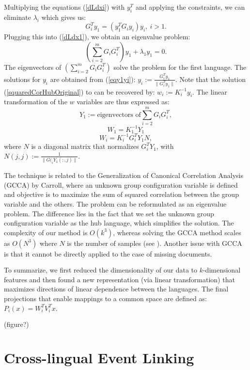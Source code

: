 \documentclass[twoside,11pt]{article}
\begin{document}
Multiplying the equations (\ref{dLdxi}) with $y_i^T$ and applying the constraints, we can eliminate $\lambda_i$ which gives us:
\begin{equation}\label{eqy1yi}
G_{i}^T y_1 = \left(y_1^T G_{i} y_i \right) y_i,~i > 1.
\end{equation}
Plugging this into (\ref{dLdx1}), we obtain an eigenvalue problem:
$$\left( \sum_{i = 2}^m G_i G_{i}^T \right) y_1 + \lambda_1 y_1 = 0.$$
The eigenvectors of $\left( \sum_{i = 2}^m G_i G_{i}^T \right)$ solve the problem for the first language. The solutions for $y_i$ are obtained from (\ref{eqy1yi}): $y_i := \frac{G_{i}^T y_1}{\| G_{i}^T y_1 \|}$.
Note that the solution (\ref{squaredCorHubOriginal}) to can be recovered by: $w_i := K_i^{-1} y_i$. The linear transformation of the $w$ variables are thus expressed as:
$$ Y_1 := \text{eigenvectors of} \sum_{i = 2}^m G_i G_{i}^T, $$
$$ W_1 = K_1^{-1} Y_1 $$
$$ W_i = K_i^{-1} G_{i}^T Y_1 N,$$
where $N$ is a diagonal matrix that normalizes $G_{i}^T Y_1$, with $N(j,j) := \frac{1}{\|G(_{i} Y_1(:,j)\|}$.

 The technique is related to the Generalization of Canonical Correlation Analysis (GCCA) by Carroll\cite{Carroll}, where an unknown group configuration variable is defined and objective is to maximize the sum of squared correlation between the group variable and the others. The problem can be reformulated as an eigenvalue problem. The difference lies in the fact that we set the unknown group configuration variable as the hub language, which simplifies the solution. The complexity of our method is $O(k^3)$, whereas solving the GCCA method scales as $O(N^3)$ where $N$ is the number of samples (see \cite{gifi}). Another issue with GCCA is that it cannot be directly applied to the case of missing documents.

To summarize, we first reduced the dimensionality of our data to $k$-dimensional features and then found a new representation (via linear transformation) that maximizes directions of linear dependence between the languages. The final projections that enable mappings to a common space are defined as: $P_i(x) = W_i^T V_i^T x.$

(figure?)


\section{Cross-lingual Event Linking}
\end{document}
